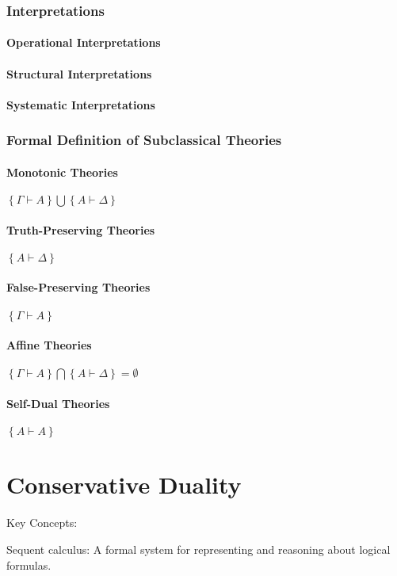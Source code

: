 \begin{center}
	\section{Interpretations}
		\subsection{Operational Interpretations}
		\subsection{Structural Interpretations}
		\subsection{Systematic Interpretations}
	\section{Formal Definition of Subclassical Theories}
		\subsection{Monotonic Theories}
		$\left\{ Γ ⊢ A \right\} \bigcup \left\{ A ⊢ Δ \right\}$
		\subsection{Truth-Preserving Theories}
		$\left\{ A ⊢ Δ \right\}$
		\subsection{False-Preserving Theories}
		$\left\{ Γ ⊢ A \right\}$
		\subsection{Affine Theories}
		$\left\{ Γ ⊢ A \right\} \bigcap \left\{ A ⊢ Δ \right\}=\emptyset$
		\subsection{Self-Dual Theories}
		$\left\{ A ⊢ A \right\}$
	
\end{center}

\part{Conservative Duality}
Key Concepts:

Sequent calculus: A formal system for representing and reasoning about logical formulas.

